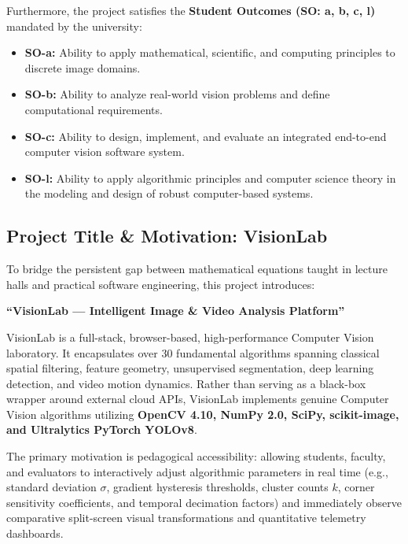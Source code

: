 Furthermore, the project satisfies the \textbf{Student Outcomes (SO: a, b, c, l)} mandated by the university:
\begin{itemize}
    \item \textbf{SO-a:} Ability to apply mathematical, scientific, and computing principles to discrete image domains.
    \item \textbf{SO-b:} Ability to analyze real-world vision problems and define computational requirements.
    \item \textbf{SO-c:} Ability to design, implement, and evaluate an integrated end-to-end computer vision software system.
    \item \textbf{SO-l:} Ability to apply algorithmic principles and computer science theory in the modeling and design of robust computer-based systems.
\end{itemize}

\subsection{Project Title \& Motivation: VisionLab}
To bridge the persistent gap between mathematical equations taught in lecture halls and practical software engineering, this project introduces:
\begin{center}
    \textbf{``VisionLab — Intelligent Image \& Video Analysis Platform''}
\end{center}

VisionLab is a full-stack, browser-based, high-performance Computer Vision laboratory. It encapsulates over 30 fundamental algorithms spanning classical spatial filtering, feature geometry, unsupervised segmentation, deep learning detection, and video motion dynamics. Rather than serving as a black-box wrapper around external cloud APIs, VisionLab implements genuine Computer Vision algorithms utilizing \textbf{OpenCV 4.10, NumPy 2.0, SciPy, scikit-image, and Ultralytics PyTorch YOLOv8}.

The primary motivation is pedagogical accessibility: allowing students, faculty, and evaluators to interactively adjust algorithmic parameters in real time (e.g., standard deviation $\sigma$, gradient hysteresis thresholds, cluster counts $k$, corner sensitivity coefficients, and temporal decimation factors) and immediately observe comparative split-screen visual transformations and quantitative telemetry dashboards.

